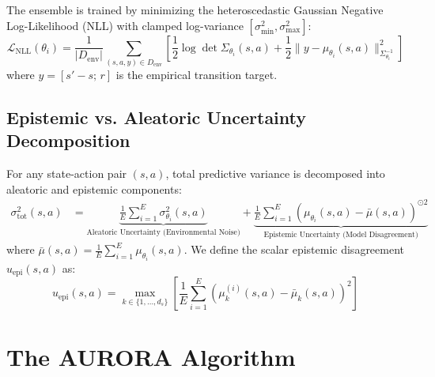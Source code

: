 \documentclass[11pt,a4paper]{article}
\theoremstyle{definition}
\theoremstyle{remark}
\begin{document}
The ensemble is trained by minimizing the heteroscedastic Gaussian Negative Log-Likelihood (NLL) with clamped log-variance $[\sigma_{\min}^2, \sigma_{\max}^2]$:
\begin{equation}
    \mathcal{L}_{\text{NLL}}(\theta_i) = \frac{1}{|D_{\text{env}}|} \sum_{(s, a, y) \in D_{\text{env}}} \left[ \frac{1}{2} \log \det \Sigma_{\theta_i}(s, a) + \frac{1}{2} \|y - \mu_{\theta_i}(s, a)\|_{\Sigma_{\theta_i}^{-1}}^2 \right]
\end{equation}
where $y = [s' - s;\, r]$ is the empirical transition target.

\subsection{Epistemic vs. Aleatoric Uncertainty Decomposition}

For any state-action pair $(s, a)$, total predictive variance is decomposed into aleatoric and epistemic components:
\begin{align}
    \sigma_{\text{tot}}^2(s, a) &= \underbrace{\frac{1}{E} \sum_{i=1}^E \sigma_{\theta_i}^2(s, a)}_{\text{Aleatoric Uncertainty (Environmental Noise)}} + \underbrace{\frac{1}{E} \sum_{i=1}^E \left( \mu_{\theta_i}(s, a) - \bar{\mu}(s, a) \right)^{\odot 2}}_{\text{Epistemic Uncertainty (Model Disagreement)}}
\end{align}
where $\bar{\mu}(s, a) = \frac{1}{E} \sum_{i=1}^E \mu_{\theta_i}(s, a)$. We define the scalar epistemic disagreement $u_{\text{epi}}(s, a)$ as:
\begin{equation}
    u_{\text{epi}}(s, a) = \max_{k \in \{1, \dots, d_s\}} \left[ \frac{1}{E} \sum_{i=1}^E \left( \mu_k^{(i)}(s, a) - \bar{\mu}_k(s, a) \right)^2 \right]
\end{equation}

\section{The AURORA Algorithm}
\label{sec:algorithm}
\end{document}
